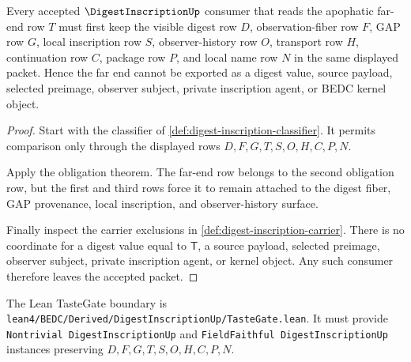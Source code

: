 \begin{theorem}
\label{thm:digest-inscription-fiber-far-end-nonescape}
Every accepted $\DigestInscriptionUp$ consumer that reads the apophatic far-end row $T$ must first keep the visible digest row $D$, observation-fiber row $F$, GAP row $G$, local inscription row $S$, observer-history row $O$, transport row $H$, continuation row $C$, package row $P$, and local name row $N$ in the same displayed packet. Hence the far end cannot be exported as a digest value, source payload, selected preimage, observer subject, private inscription agent, or BEDC kernel object.
\end{theorem}
\begin{proof}
Start with the classifier of \autoref{def:digest-inscription-classifier}. It permits comparison only through the displayed rows $D,F,G,T,S,O,H,C,P,N$.

Apply the obligation theorem. The far-end row belongs to the second obligation row, but the first and third rows force it to remain attached to the digest fiber, GAP provenance, local inscription, and observer-history surface.

Finally inspect the carrier exclusions in \autoref{def:digest-inscription-carrier}. There is no coordinate for a digest value equal to $\mathsf{T}$, a source payload, selected preimage, observer subject, private inscription agent, or kernel object. Any such consumer therefore leaves the accepted packet.
\end{proof}



The Lean TasteGate boundary is \texttt{lean4/BEDC/Derived/DigestInscriptionUp/TasteGate.lean}. It must provide \texttt{Nontrivial DigestInscriptionUp} and \texttt{FieldFaithful DigestInscriptionUp} instances preserving $D,F,G,T,S,O,H,C,P,N$.

